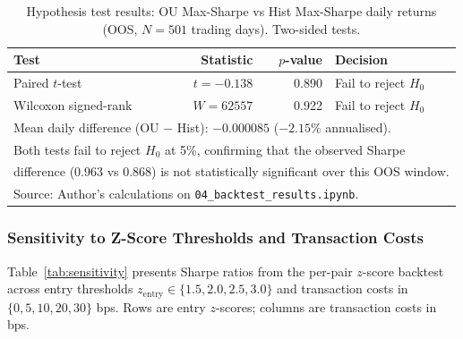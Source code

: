 \documentclass[a4paper]{report}
\begin{document}
\begin{table}[htbp]
\centering
\caption{Hypothesis test results: OU Max-Sharpe vs Hist Max-Sharpe daily returns
(OOS, $N = 501$ trading days). Two-sided tests.}
\label{tab:paired_test}
\begin{tabular}{lrrl}
\toprule
Test & Statistic & $p$-value & Decision \\
\midrule
Paired $t$-test         & $t = -0.138$ & 0.890 & Fail to reject $H_0$ \\
Wilcoxon signed-rank    & $W = 62557$ & 0.922 & Fail to reject $H_0$ \\
\bottomrule
\multicolumn{4}{l}{\small Mean daily difference (OU $-$ Hist): $-0.000085$ ($-2.15\%$ annualised).} \\
\multicolumn{4}{l}{\small Both tests fail to reject $H_0$ at 5\%, confirming that the observed Sharpe} \\
\multicolumn{4}{l}{\small difference (0.963 vs 0.868) is not statistically significant over this OOS window.} \\
\multicolumn{4}{l}{\small Source: Author's calculations on \texttt{04\_backtest\_results.ipynb}.}
\end{tabular}
\end{table}

\subsubsection{Sensitivity to Z-Score Thresholds and Transaction Costs}

Table~\ref{tab:sensitivity} presents Sharpe ratios from the per-pair $z$-score backtest
across entry thresholds $z_{\text{entry}} \in \{1.5, 2.0, 2.5, 3.0\}$ and transaction
costs in $\{0, 5, 10, 20, 30\}$ bps. Rows are entry $z$-scores; columns are transaction costs in bps.
\end{document}
